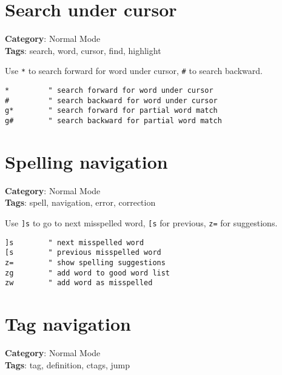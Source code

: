 {{{{{{{{{\section{Search under cursor}

\textbf{Category}: Normal Mode\\ \textbf{Tags}: search, word, cursor, find, highlight
\vspace{0.5cm}

Use {\footnotesize \Verb§*§} to search forward for word under cursor, {\footnotesize \Verb§#§} to search backward.

\begin{Exa*}{}
\begin{Verbatim}[fontsize=\footnotesize, breaklines, breakanywhere]
*         " search forward for word under cursor
#         " search backward for word under cursor
g*        " search forward for partial word match
g#        " search backward for partial word match
\end{Verbatim}
\end{Exa*}

\section{Spelling navigation}

\textbf{Category}: Normal Mode\\ \textbf{Tags}: spell, navigation, error, correction
\vspace{0.5cm}

Use {\footnotesize \Verb§]s§} to go to next misspelled word, {\footnotesize \Verb§[s§} for previous, {\footnotesize \Verb§z=§} for suggestions.

\begin{Exa*}{}
\begin{Verbatim}[fontsize=\footnotesize, breaklines, breakanywhere]
]s        " next misspelled word
[s        " previous misspelled word
z=        " show spelling suggestions
zg        " add word to good word list
zw        " add word as misspelled
\end{Verbatim}
\end{Exa*}

\section{Tag navigation}

\textbf{Category}: Normal Mode\\ \textbf{Tags}: tag, definition, ctags, jump
\vspace{0.5cm}

}}}}}}}}}
